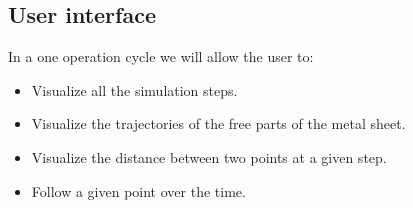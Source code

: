 \documentclass{beamer}
\begin{document}
\subsection{User interface}
\begin{frame}
    In a one operation cycle we will allow the user to:
    \begin{itemize}
        \item Visualize all the simulation steps.
        \item Visualize the trajectories of the free parts of the metal sheet.
        \item Visualize the distance between two points at a given step.
        \item Follow a given point over the time.
    \end{itemize}
\end{frame}
\end{document}
